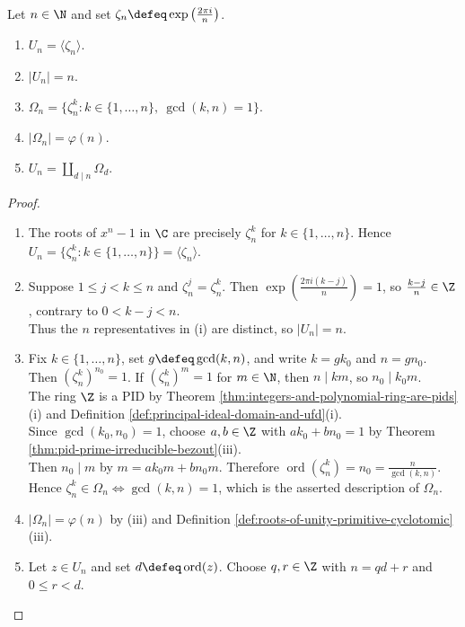 \begin{proposition} \label{prop:roots-of-unity-cyclic-structure} \\
Let $n\in\N$ and set $\zeta_n\defeq\exp\left(\frac{2\pi i}{n}\right)$.
\begin{enumerate}[label=(\roman*)]
\setlength{\itemsep}{0pt}
\item $U_n=\langle\zeta_n\rangle$.
\item $|U_n|=n$.
\item $\Omega_n=\{\zeta_n^k:k\in\{1,\ldots,n\},\ \gcd(k,n)=1\}$.
\item $|\Omega_n|=\varphi(n)$.
\item $U_n=\coprod\limits_{d\mid n}\Omega_d$.
\end{enumerate}
\begin{proof}
\begin{enumerate}[label=(\roman*)]
\setlength{\itemsep}{0pt}
\item The roots of $x^n-1$ in $\C$ are precisely $\zeta_n^k$ for $k\in\{1,\ldots,n\}$. Hence $U_n=\{\zeta_n^k:k\in\{1,\ldots,n\}\}=\langle\zeta_n\rangle$.
\item Suppose $1\leq j<k\leq n$ and $\zeta_n^j=\zeta_n^k$. Then $\exp\left(\frac{2\pi i(k-j)}{n}\right)=1$, so $\frac{k-j}{n}\in\Z$, contrary to $0<k-j<n$.\\
Thus the $n$ representatives in (i) are distinct, so $|U_n|=n$.
\item Fix $k\in\{1,\ldots,n\}$, set $g\defeq\gcd(k,n)$, and write $k=gk_0$ and $n=gn_0$.\\
Then $(\zeta_n^k)^{n_0}=1$. If $(\zeta_n^k)^m=1$ for $m\in\N$, then $n\mid km$, so $n_0\mid k_0m$.\\
The ring $\Z$ is a PID by Theorem \ref{thm:integers-and-polynomial-ring-are-pids}(i) and Definition \ref{def:principal-ideal-domain-and-ufd}(i).\\
Since $\gcd(k_0,n_0)=1$, choose $a,b\in\Z$ with $ak_0+bn_0=1$ by Theorem \ref{thm:pid-prime-irreducible-bezout}(iii).\\
Then $n_0\mid m$ by $m=ak_0m+bn_0m$. Therefore $\operatorname{ord}(\zeta_n^k)=n_0=\frac{n}{\gcd(k,n)}$.\\
Hence $\zeta_n^k\in\Omega_n\Longleftrightarrow\gcd(k,n)=1$, which is the asserted description of $\Omega_n$.
\item $|\Omega_n|=\varphi(n)$ by (iii) and Definition \ref{def:roots-of-unity-primitive-cyclotomic}(iii).
\item Let $z\in U_n$ and set $d\defeq\operatorname{ord}(z)$. Choose $q,r\in\Z$ with $n=qd+r$ and $0\leq r<d$.\\

\end{enumerate}
\end{proof}
\end{proposition}
